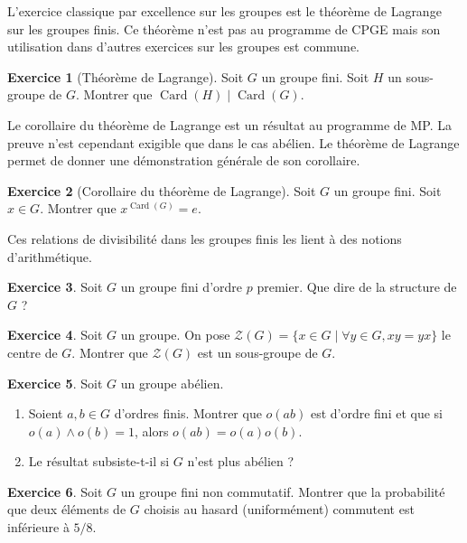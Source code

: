 \documentclass[12pt,a4paper]{book}
\theoremstyle{definition}
\newtheorem{exo}{Exercice}[section]
\theoremstyle{remark}
\DeclareMathOperator{\Card}{Card}
\begin{document}
L'exercice classique par excellence sur les groupes est le théorème de Lagrange sur les groupes finis. Ce théorème n'est pas au programme de CPGE mais son utilisation dans d'autres exercices sur les groupes est commune.

\begin{exo}[Théorème de Lagrange]
 Soit $G$ un groupe fini. Soit $H$ un sous-groupe de $G$. Montrer que $\Card (H) \mid \Card (G)$.
\end{exo}

Le corollaire du théorème de Lagrange est un résultat au programme de MP. La preuve n'est cependant exigible que dans le cas abélien. Le théorème de Lagrange permet de donner une démonstration générale de son corollaire.

\begin{exo}[Corollaire du théorème de Lagrange]
 Soit $G$ un groupe fini. Soit $x \in G$. Montrer que $x ^ {\Card (G)} = e$.
\end{exo}

Ces relations de divisibilité dans les groupes finis les lient à des notions d'arithmétique.

\begin{exo}
    Soit $G$ un groupe fini d'ordre $p$ premier. Que dire de la structure de $G$ ?
\end{exo}

\begin{exo}
    Soit $G$ un groupe. On pose $\mathcal{Z}(G) = \{x \in G \mid \forall y\in G, xy=yx\}$ le centre de $G$. Montrer que $\mathcal{Z}(G)$ est un sous-groupe de $G$.
\end{exo}

\begin{exo}
    Soit $G$ un groupe abélien.
    \begin{enumerate}
        \item Soient $a,b \in G$ d'ordres finis. Montrer que $o(ab)$ est d'ordre fini et que si $o(a) \wedge o(b) = 1$, alors $o(ab)=o(a)o(b)$.
        \item Le résultat subsiste-t-il si $G$ n'est plus abélien ?
    \end{enumerate}
\end{exo}

\begin{exo}
    Soit $G$ un groupe fini non commutatif. Montrer que la probabilité que deux éléments de $G$ choisis au hasard (uniformément) commutent est inférieure à $5/8$.
\end{exo}
\end{document}
